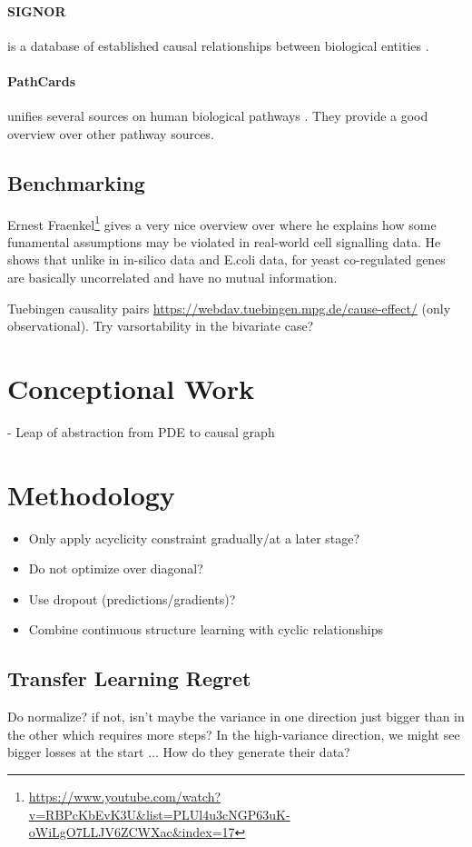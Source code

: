 \documentclass{article}
\begin{document}
\paragraph{SIGNOR} is a database of established causal relationships between biological entities \cite{perfetto2016signor}.

\paragraph{PathCards} unifies several sources on human biological pathways \cite{belinky2015pathcards}.
They provide a good overview over other pathway sources.

\subsection{Benchmarking}

Ernest Fraenkel\footnote{\url{https://www.youtube.com/watch?v=RBPcKbEvK3U&list=PLUl4u3cNGP63uK-oWiLgO7LLJV6ZCWXac&index=17}} gives a very nice overview over \cite{marbach2012wisdom} where he explains how some funamental assumptions may be violated in real-world cell signalling data.
He shows that unlike in in-silico data and E.coli data, for yeast co-regulated genes are basically uncorrelated and have no mutual information.

Tuebingen causality pairs \url{https://webdav.tuebingen.mpg.de/cause-effect/} (only observational).
Try varsortability in the bivariate case?

\section{Conceptional Work}
    - Leap of abstraction from PDE to causal graph

\section{Methodology}
\begin{itemize}
    \item Only apply acyclicity constraint gradually/at a later stage?
    \item Do not optimize over diagonal?
    \item Use dropout (predictions/gradients)?
    \item Combine continuous structure learning with cyclic relationships
\end{itemize}

\subsection{Transfer Learning Regret}
Do \cite{bengio2019meta} normalize? if not, isn't maybe the variance in one direction just bigger than in the other which requires more steps? In the high-variance direction, we might see bigger losses at the start $\dots$
How do they generate their data?
\end{document}
